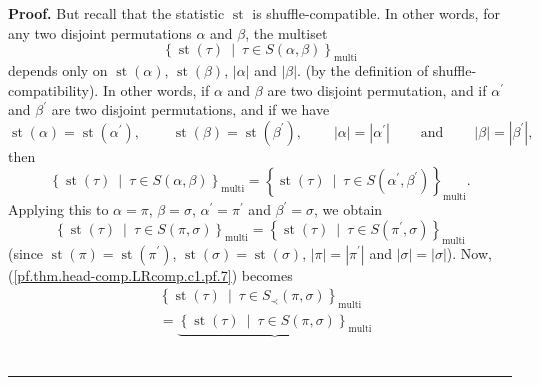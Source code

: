 \documentclass[numbers=enddot,12pt,final,onecolumn,notitlepage]{scrartcl}%
\theoremstyle{definition}
\newenvironment{proof}[1][Proof]{\noindent\textbf{#1.} }{\ \rule{0.5em}{0.5em}}
\begin{document}
\begin{proof}
But recall that the statistic $\operatorname*{st}$ is shuffle-compatible. In
other words, for any two disjoint permutations $\alpha$ and $\beta$, the
multiset%
\[
\left\{  \operatorname*{st}\left(  \tau\right)  \ \mid\ \tau\in S\left(
\alpha,\beta\right)  \right\}  _{\operatorname*{multi}}%
\]
depends only on $\operatorname*{st}\left(  \alpha\right)  $,
$\operatorname*{st}\left(  \beta\right)  $, $\left\vert \alpha\right\vert $
and $\left\vert \beta\right\vert $. (by the definition of
shuffle-compatibility). In other words, if $\alpha$ and $\beta$ are two
disjoint permutation, and if $\alpha^{\prime}$ and $\beta^{\prime}$ are two
disjoint permutations, and if we have%
\[
\operatorname*{st}\left(  \alpha\right)  =\operatorname*{st}\left(
\alpha^{\prime}\right)  ,\ \ \ \ \ \ \ \ \ \ \operatorname*{st}\left(
\beta\right)  =\operatorname*{st}\left(  \beta^{\prime}\right)
,\ \ \ \ \ \ \ \ \ \ \left\vert \alpha\right\vert =\left\vert \alpha^{\prime
}\right\vert \ \ \ \ \ \ \ \ \ \ \text{and}\ \ \ \ \ \ \ \ \ \ \left\vert
\beta\right\vert =\left\vert \beta^{\prime}\right\vert ,
\]
then%
\[
\left\{  \operatorname*{st}\left(  \tau\right)  \ \mid\ \tau\in S\left(
\alpha,\beta\right)  \right\}  _{\operatorname*{multi}}=\left\{
\operatorname*{st}\left(  \tau\right)  \ \mid\ \tau\in S\left(  \alpha
^{\prime},\beta^{\prime}\right)  \right\}  _{\operatorname*{multi}}.
\]
Applying this to $\alpha=\pi$, $\beta=\sigma$, $\alpha^{\prime}=\pi^{\prime}$
and $\beta^{\prime}=\sigma$, we obtain
\begin{equation}
\left\{  \operatorname*{st}\left(  \tau\right)  \ \mid\ \tau\in S\left(
\pi,\sigma\right)  \right\}  _{\operatorname*{multi}}=\left\{
\operatorname*{st}\left(  \tau\right)  \ \mid\ \tau\in S\left(  \pi^{\prime
},\sigma\right)  \right\}  _{\operatorname*{multi}}
\label{pf.thm.head-comp.LRcomp.c1.pf.9}%
\end{equation}
(since $\operatorname*{st}\left(  \pi\right)  =\operatorname*{st}\left(
\pi^{\prime}\right)  $, $\operatorname*{st}\left(  \sigma\right)
=\operatorname*{st}\left(  \sigma\right)  $, $\left\vert \pi\right\vert
=\left\vert \pi^{\prime}\right\vert $ and $\left\vert \sigma\right\vert
=\left\vert \sigma\right\vert $). Now, (\ref{pf.thm.head-comp.LRcomp.c1.pf.7})
becomes%
\begin{align*}
&  \left\{  \operatorname*{st}\left(  \tau\right)  \ \mid\ \tau\in S_{\prec
}\left(  \pi,\sigma\right)  \right\}  _{\operatorname*{multi}}\\
&  =\underbrace{\left\{  \operatorname*{st}\left(  \tau\right)  \ \mid
\ \tau\in S\left(  \pi,\sigma\right)  \right\}  _{\operatorname*{multi}}%
}
\end{align*}
\end{proof}
\end{document}
